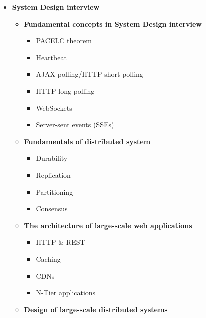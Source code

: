 \begin{center}
\end{center}

\vspace{0.3cm}
\begin{itemize}
\item \textbf{System Design interview}
\begin{itemize}
\item \textbf{Fundamental concepts in System Design interview}
\begin{itemize}
\item PACELC theorem
\item Heartbeat
\item AJAX polling/HTTP short-polling
\item HTTP long-polling
\item WebSockets
\item Server-sent events (SSEs)
\end{itemize}
\end{itemize}
\begin{itemize}
\item \textbf{Fundamentals of distributed system}
\begin{itemize}
\item Durability
\item Replication
\item Partitioning
\item Consensus
\end{itemize}
\end{itemize}
\begin{itemize}
\item \textbf{The architecture of large-scale web applications}
\begin{itemize}
\item HTTP \& REST
\item Caching
\item CDNs
\item N-Tier applications
\end{itemize}
\end{itemize}
\begin{itemize}
\item \textbf{Design of large-scale distributed systems}
\end{itemize}
\end{itemize}